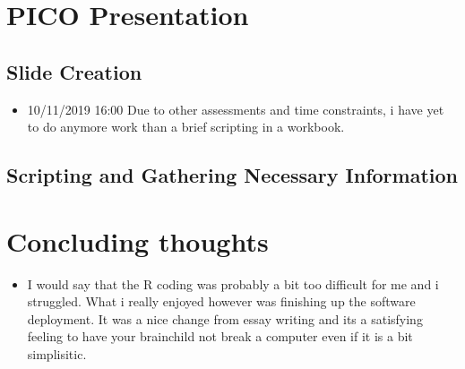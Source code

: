 \documentclass{article}
\begin{document}
\section{PICO Presentation}

\subsection{Slide Creation}

\begin{itemize}
\item{10/11/2019 16:00 Due to other assessments and time constraints, i have yet to do anymore work than a brief scripting in a workbook.} 
\end{itemize}



\subsection{Scripting and Gathering Necessary Information}

\section{Concluding thoughts}

\begin{itemize}
\item{I would say that the R coding was probably a bit too difficult for me and i struggled. What i really enjoyed however was finishing up the software deployment. It was a nice change from essay writing and its a satisfying feeling to have your brainchild not break a computer even if it is a bit simplisitic.} 
\end{itemize}
\end{document}
